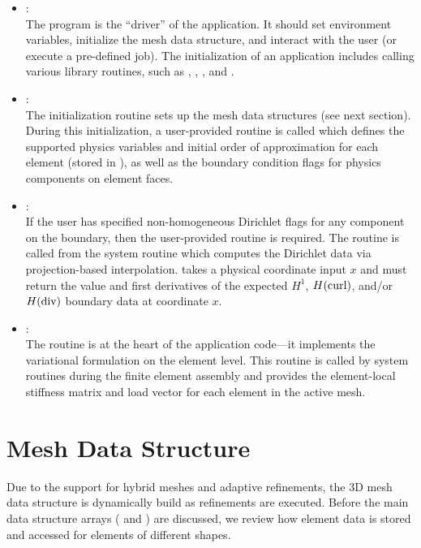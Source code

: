 \begin{itemize}
	\item{
		 : \\
		The  program is the ``driver'' of the application. It should set environment variables, initialize the mesh data structure, and interact with the user (or execute a pre-defined job). The initialization of an application includes calling various library routines, such as , , , and .
	}
	\item{
		 : \\
		The initialization routine  sets up the mesh data structures (see next section). During this initialization, a user-provided routine  is called which defines the supported physics variables and initial order of approximation for each element (stored in ), as well as the boundary condition flags for physics components on element faces.
	}
	\item{
		 : \\
		If the user has specified non-homogeneous Dirichlet flags for any component on the boundary, then the user-provided  routine is required. The routine is called from the system routine  which computes the Dirichlet data via projection-based interpolation.  takes a physical coordinate input $x$ and must return the value and first derivatives of the expected $H^1$, $H(\text{curl})$, and/or $H(\text{div})$ boundary data at coordinate $x$.
	}
	\item{
		 : \\
		The  routine is at the heart of the application code---it implements the variational formulation on the element level. This routine is called by system routines during the finite element assembly and provides the element-local stiffness matrix and load vector for each element in the active mesh.
	}
\end{itemize}

\section{Mesh Data Structure}
\label{sec:data-structure}

Due to the support for hybrid meshes and adaptive refinements, the \hp3D mesh data structure is dynamically build as refinements are executed. Before the main data structure arrays ( and ) are discussed, we review how element data is stored and accessed for elements of different shapes.

